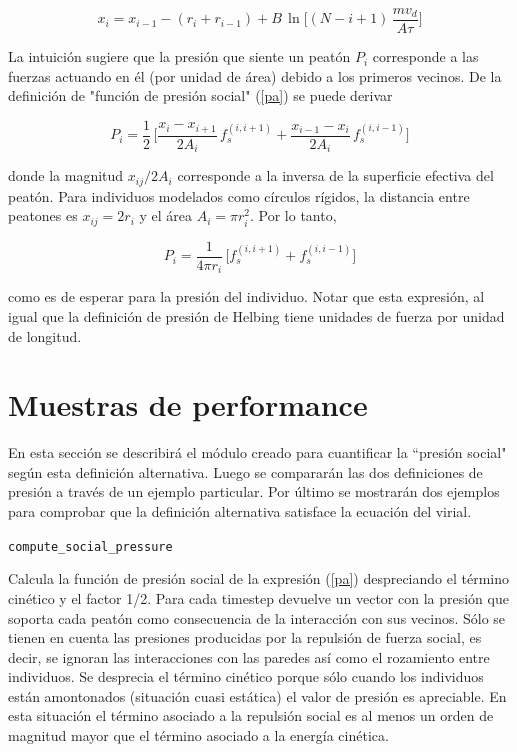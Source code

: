 \begin{equation} 
x_i=x_{i-1}-(r_{i}+r_{i-1})+B\,\ln\bigg[(N-i+1)\,\displaystyle\frac{mv_d}{A\tau}
\bigg]\label{eqn_8}
\end{equation}

La intuición sugiere que la presión que siente un peatón $P_i$ 
corresponde a las fuerzas actuando en él (por unidad de área) debido a los primeros vecinos. De la definición de "función de presión social" (\ref{pa}) se puede derivar

\begin{equation}
P_i=\displaystyle\frac{1}{2}\,\bigg[\displaystyle\frac{x_{i}-x_{i+1}}{2A_i}\,
f_s^ { (i , i+1) } +\displaystyle\frac { x_ {i-1}-x_{i}}{2A_i}\,f_s^{(i,i-1) 
}\bigg]\label{eqn_9}
\end{equation}

\vspace{3mm}

donde la magnitud $x_{ij}/2A_i$ corresponde a la inversa de la superficie efectiva del peatón. Para individuos modelados como círculos rígidos, la distancia entre peatones es $x_{ij}=2r_i$ y el área $A_i=\pi r_i^2$. Por lo tanto, 

\begin{equation}
P_i=\displaystyle\frac{1}{4\pi 
r_i}\,\bigg[f_s^ { (i , i+1) } +f_s^{(i,i-1)}\bigg]\label{eqn_10}
\end{equation}

como es de esperar para la presión del individuo. Notar que esta expresión, al igual que la definición de presión de Helbing tiene unidades de fuerza por unidad de longitud. \\


\section{\label{Muestras de performace} Muestras de performance} 

En esta sección se describirá el módulo creado para cuantificar la ``presión social" según esta definición alternativa. Luego se compararán las dos definiciones de presión a través de un ejemplo particular. Por último se mostrarán dos ejemplos para comprobar que la definición alternativa satisface la ecuación del virial. 

{\Large {\tt compute\_social\_pressure}}

Calcula la función de presión social de la expresión (\ref{pa}) despreciando el término cinético y el factor 1/2. Para cada timestep devuelve un vector con la presión que soporta cada peatón como consecuencia de la interacción con sus vecinos. Sólo se tienen en cuenta las presiones producidas por la repulsión de fuerza social, es decir, se ignoran las interacciones con las paredes así como el rozamiento entre individuos. Se desprecia el término cinético porque sólo cuando los individuos están amontonados (situación cuasi estática) el valor de presión es apreciable. En esta situación el término asociado a la repulsión social es al menos un orden de magnitud mayor que el término asociado a la energía cinética. \\

